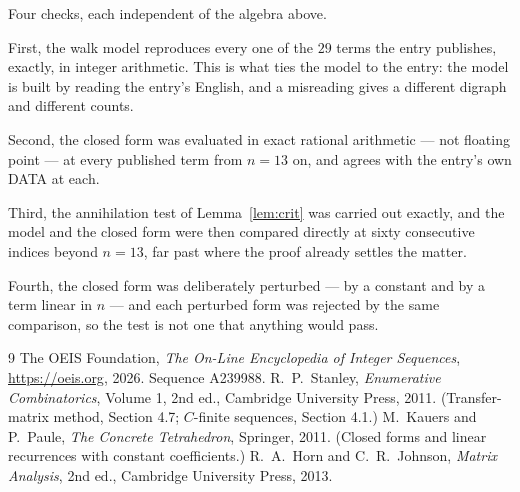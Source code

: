 \documentclass[11pt,a4paper]{article}
\theoremstyle{plain}
\theoremstyle{definition}
\begin{document}
Four checks, each independent of the algebra above.

First, the walk model reproduces every one of the $29$ terms the entry publishes,
exactly, in integer arithmetic. This is what ties the model to the entry: the model is built
by reading the entry's English, and a misreading gives a different digraph and different
counts.

Second, the closed form was evaluated in exact rational arithmetic --- not floating point ---
at every published term from $n=13$ on, and agrees with the entry's own DATA at each.

Third, the annihilation test of Lemma~\ref{lem:crit} was carried out exactly, and the model
and the closed form were then compared directly at sixty consecutive indices beyond
$n=13$, far past where the proof already settles the matter.

Fourth, the closed form was deliberately perturbed --- by a constant and by a term linear in
$n$ --- and each perturbed form was rejected by the same comparison, so the test is not one
that anything would pass.

\begin{thebibliography}{9}
 The OEIS Foundation, \emph{The On-Line Encyclopedia of Integer
Sequences}, \url{https://oeis.org}, 2026. Sequence A239988.
 R.~P.~Stanley, \emph{Enumerative Combinatorics}, Volume 1, 2nd ed.,
Cambridge University Press, 2011. (Transfer-matrix method, Section 4.7; $C$-finite sequences,
Section 4.1.)
 M.~Kauers and P.~Paule, \emph{The Concrete Tetrahedron}, Springer, 2011.
(Closed forms and linear recurrences with constant coefficients.)
 R.~A.~Horn and C.~R.~Johnson, \emph{Matrix Analysis}, 2nd ed., Cambridge
University Press, 2013.
\end{thebibliography}
\end{document}
